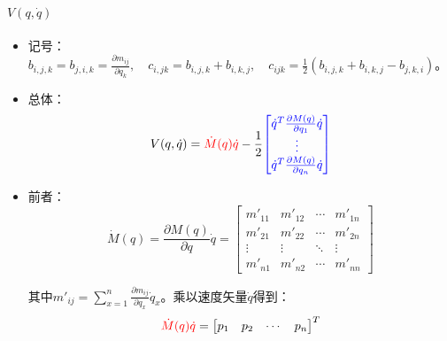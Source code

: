 \documentclass[
12pt, %
a4paper, 
oneside, %
]{scrartcl}
\begin{document}
\paragraph{$ V(q, \dot{q}) $}
\begin{itemize}
\item 记号：$ b_{i,j,k} = b_{j,i,k} = \frac{\partial m_{ij}}{\partial q_k}, \quad c_{i,j k} = b_{i,j,k} + b_{i,k,j}, \quad c_{ijk} = \frac{1}{2}(b_{i,j,k} + b_{i,k,j} - b_{j,k,i}) $。
\item 总体：
$$ V(q, \dot{q}) = \textcolor{red}{\dot{M}(q) \dot{q}} - \frac{1}{2}\textcolor{blue}{\begin{bmatrix} \dot{q}^T \frac{\partial M(q)}{\partial q_1}\dot{q} \\ \vdots \\ \dot{q}^T \frac{\partial M(q)}{\partial q_n}\dot{q} \end{bmatrix}} $$
\item 前者：
$$ \dot{M}(q) = \frac{\partial M(q)}{\partial q}\dot{q} = \begin{bmatrix} m'_{11} & m'_{12} & \cdots & m'_{1n} \\ m'_{21} & m'_{22} & \cdots & m'_{2n} \\ \vdots & \vdots & \ddots & \vdots \\ m'_{n1} & m'_{n2} & \cdots & m'_{nn} \end{bmatrix} $$

其中$ m'_{ij} = \sum_{x = 1}^n \frac{\partial m_{ij}}{\partial q_x}\dot{q}_x $。乘以速度矢量$ \dot{q} $得到：
$$ \textcolor{red}{\dot{M}(q) \dot{q}} = \begin{bmatrix} p_1 & p_2 & \cdots & p_n \end{bmatrix}^T $$


\end{itemize}
\end{document}

